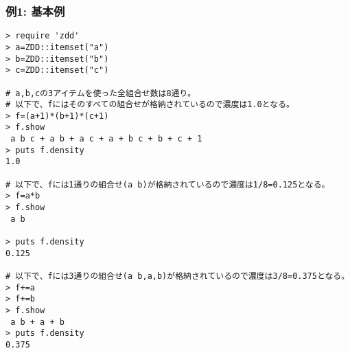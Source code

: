 \subsubsection*{例1: 基本例}



\begin{Verbatim}[baselinestretch=0.7,frame=single]
> require 'zdd'
> a=ZDD::itemset("a")
> b=ZDD::itemset("b")
> c=ZDD::itemset("c")

# a,b,cの3アイテムを使った全組合せ数は8通り。
# 以下で、fにはそのすべての組合せが格納されているので濃度は1.0となる。
> f=(a+1)*(b+1)*(c+1)
> f.show
 a b c + a b + a c + a + b c + b + c + 1
> puts f.density
1.0

# 以下で、fには1通りの組合せ(a b)が格納されているので濃度は1/8=0.125となる。
> f=a*b
> f.show
 a b

> puts f.density
0.125

# 以下で、fには3通りの組合せ(a b,a,b)が格納されているので濃度は3/8=0.375となる。
> f+=a
> f+=b
> f.show
 a b + a + b
> puts f.density
0.375
\end{Verbatim}
